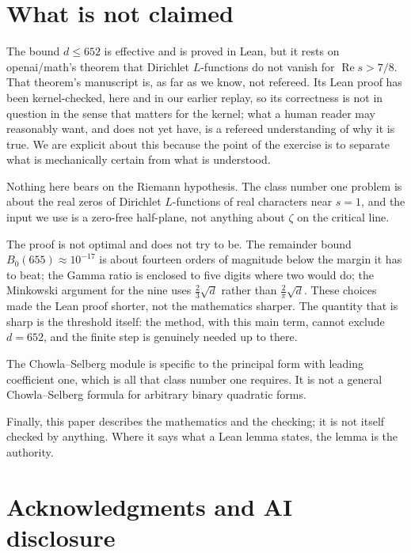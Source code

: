 \documentclass[11pt]{article}
\theoremstyle{definition}
\newcommand{\re}{\operatorname{Re}}
\begin{document}
\section{What is not claimed}\label{sec:notclaimed}

The bound $d \le 652$ is effective and is proved in Lean, but it rests on openai/math's theorem that Dirichlet $L$-functions do not vanish for $\re s > 7/8$. That theorem's manuscript \cite{OAIqrh} is, as far as we know, not refereed. Its Lean proof has been kernel-checked, here and in our earlier replay, so its correctness is not in question in the sense that matters for the kernel; what a human reader may reasonably want, and does not yet have, is a refereed understanding of why it is true. We are explicit about this because the point of the exercise is to separate what is mechanically certain from what is understood.

Nothing here bears on the Riemann hypothesis. The class number one problem is about the real zeros of Dirichlet $L$-functions of real characters near $s = 1$, and the input we use is a zero-free half-plane, not anything about $\zeta$ on the critical line.

The proof is not optimal and does not try to be. The remainder bound $B_0(655) \approx 10^{-17}$ is about fourteen orders of magnitude below the margin it has to beat; the Gamma ratio is enclosed to five digits where two would do; the Minkowski argument for the nine uses $\frac23\sqrt d$ rather than $\frac2\pi\sqrt d$. These choices made the Lean proof shorter, not the mathematics sharper. The quantity that is sharp is the threshold itself: the method, with this main term, cannot exclude $d = 652$, and the finite step is genuinely needed up to there.

The Chowla--Selberg module is specific to the principal form with leading coefficient one, which is all that class number one requires. It is not a general Chowla--Selberg formula for arbitrary binary quadratic forms.

Finally, this paper describes the mathematics and the checking; it is not itself checked by anything. Where it says what a Lean lemma states, the lemma is the authority.

\section*{Acknowledgments and AI disclosure}
\end{document}
